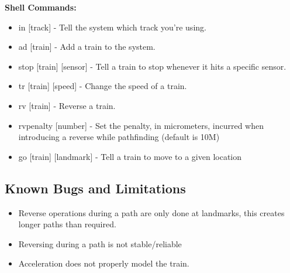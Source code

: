 \documentclass{article}
\begin{document}
\textbf{Shell Commands:}
\begin{itemize}
    \item in [track] - Tell the system which track you're using.
    \item ad [train] - Add a train to the system.
    \item stop [train] [sensor] - Tell a train to stop whenever it hits a specific sensor.
    \item tr [train] [speed] - Change the speed of a train.
    \item rv [train] - Reverse a train.
    \item rvpenalty [number] - Set the penalty, in micrometers, incurred when introducing a reverse while pathfinding (default is 10M)
    \item go [train] [landmark] - Tell a train to move to a given location
\end{itemize}

\subsection{Known Bugs and Limitations}
\begin{itemize}
\item Reverse operations during a path are only done at landmarks, this creates longer paths than required.
\item Reversing during a path is not stable/reliable
\item Acceleration does not properly model the train.
\end{itemize}
\end{document}

